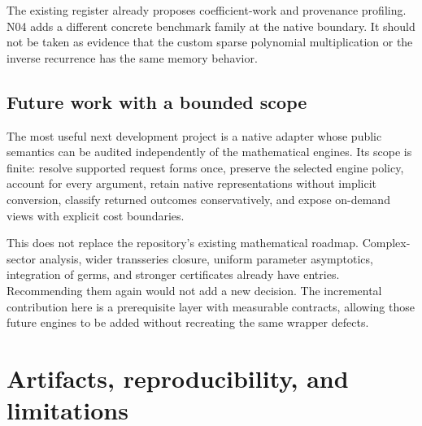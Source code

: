 \documentclass[11pt]{article}
\begin{document}
The existing register already proposes coefficient-work and provenance profiling. N04 adds a different concrete benchmark family at the native boundary. It should not be taken as evidence that the custom sparse polynomial multiplication or the inverse recurrence has the same memory behavior.

\subsection{Future work with a bounded scope}
The most useful next development project is a native adapter whose public semantics can be audited independently of the mathematical engines. Its scope is finite: resolve supported request forms once, preserve the selected engine policy, account for every argument, retain native representations without implicit conversion, classify returned outcomes conservatively, and expose on-demand views with explicit cost boundaries.

This does not replace the repository's existing mathematical roadmap. Complex-sector analysis, wider transseries closure, uniform parameter asymptotics, integration of germs, and stronger certificates already have entries. Recommending them again would not add a new decision. The incremental contribution here is a prerequisite layer with measurable contracts, allowing those future engines to be added without recreating the same wrapper defects.

\section{Artifacts, reproducibility, and limitations}
\end{document}
